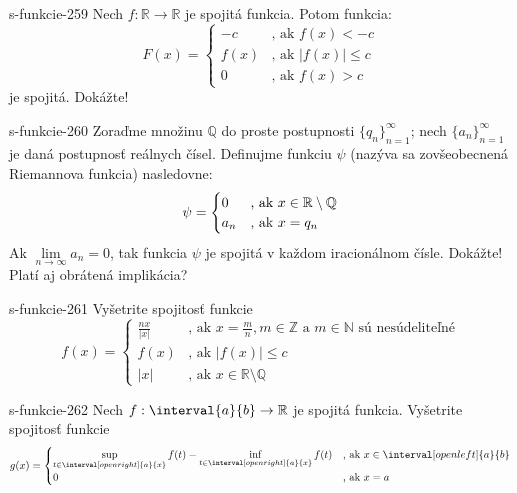\begin{defproblem}{s-funkcie-259}
Nech $f: \mathbb{R} \rightarrow \mathbb{R}$ je spojitá funkcia. Potom funkcia:
\[
F(x) = \begin{cases}
    -c   & \text{, ak } f(x)<-c \\
    f(x) & \text{, ak } |f(x)|\leq c \\
    0    & \text{, ak } f(x)>c
\end{cases}
\]
je spojitá. Dokážte!
\end{defproblem}

\begin{defproblem}{s-funkcie-260}
Zoraďme množinu $\mathbb{Q}$ do proste postupnosti ${\{q_n\}}_{n=1}^\infty$;
nech ${\{a_n\}}_{n=1}^\infty$ je daná postupnosť reálnych čísel. Definujme
funkciu $\psi$ (nazýva sa zovšeobecnená Riemannova funkcia) nasledovne:
\[
  \psi = \begin{cases}
  0 & $, ak $ x \in \mathbb{R} \setminus \mathbb{Q} \\
  a_n &  $, ak $ x=q_n
\end{cases}
\]
  Ak $\lim\limits_{n \rightarrow \infty} a_n=0$, tak funkcia $\psi$ je spojitá v
  každom iracionálnom čísle. Dokážte! Platí aj obrátená implikácia?
\end{defproblem}

\begin{defproblem}{s-funkcie-261}
Vyšetrite spojitosť funkcie
\[
  f(x) =
  \begin{cases}
      \frac{nx}{|x|} & \text{, ak } x=\frac{m}{n}, m\in \mathbb{Z} \text{ a } m\in \mathbb{N} \text{ sú nesúdeliteľné} \\
      f(x)           & \text{, ak } |f(x)|\leq c \\
      |x|            & \text{, ak } x \in \mathbb{R} \setminus \mathbb{Q}
  \end{cases}
\]
\end{defproblem}

\begin{defproblem}{s-funkcie-262}
Nech $f: \interval{a}{b} \rightarrow \mathbb{R}$ je spojitá funkcia. Vyšetrite
spojitosť funkcie
\[
  g(x) = \begin{cases}
  \sup\limits_{t \in \interval[open right]{a}{x}}f(t)
    - \inf\limits_{t \in \interval[open right]{a}{x}}f(t)
      &$, ak $ x \in \interval[open left]{a}{b} \\
  0 &  $, ak $ x=a
\end{cases}
\]
\end{defproblem}

